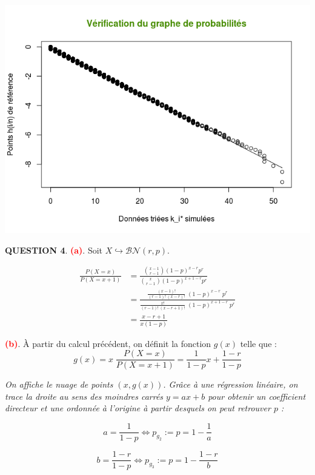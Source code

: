 \documentclass[a4paper,11pt]{article}
\newcommand{\quest}[1]{\small\textbf{#1}\normalsize}
\theoremstyle{nonumberplain}
\theoremstyle{nonumberplain}
\theoremstyle{nonumberplain}
\theoremstyle{nonumberplain}
\begin{document}
        \begin{center}
            \includegraphics[scale=0.75]{images/p1_q3_verif.png}
        \end{center}

      \quest{QUESTION 4}. \textbf{\textcolor{red}{(a)}}. Soit $X \hookrightarrow \mathcal{BN}(r, p)$.
      \begin{calculs}
          \vspace{-2ex}
          \begin{equation*}
          \begin{split}
              \frac{P(X = x)}{P(X = x + 1)} & = \frac{\binom{x - 1}{r - 1} (1 - p)^{x - r}p^r}{\binom{x}{r - 1} (1 - p)^{x + 1 - r}p^r} \\[2ex]
                                            & = \frac{\frac{(x - 1)!}{(r - 1)!\ (x - r)!}\;(1 - p)^{x - r}\;p^r}{\frac{x!}{(r - 1)!\ (x - r + 1)!}\;(1 - p)^{x + 1 - r}\;p^r} \\[2ex]
                                            & = \frac{x - r + 1}{x (1 - p)}
          \end{split}
          \end{equation*}
      \end{calculs}

      \bigskip
      \textbf{\textcolor{red}{(b)}}. \`{A} partir du calcul précédent, on définit la fonction $g(x)$ telle que :
          \[
              g(x) = x\;\frac{P(X = x)}{P(X = x + 1)} = \frac{1}{1 - p}x + \frac{1 - r}{1 - p}
          \]

      \begin{calculs}
          \hspace{-1ex}\emph{On affiche le nuage de points $(x, g(x))$. Grâce à une régression linéaire, on trace
          la droite au sens des moindres carrés $y = ax + b$ pour obtenir un coefficient directeur et une ordonnée
          à l'origine à partir desquels on peut retrouver $p$ :}

            \[
                a = \frac{1}{1 - p} \iff p_{g_2} := p = 1 - \frac{1}{a}
            \]

            \[
                b = \frac{1 - r}{1 - p} \iff p_{g_3} := p = 1 - \frac{1 - r}{b}
            \]
      \end{calculs}
\end{document}
